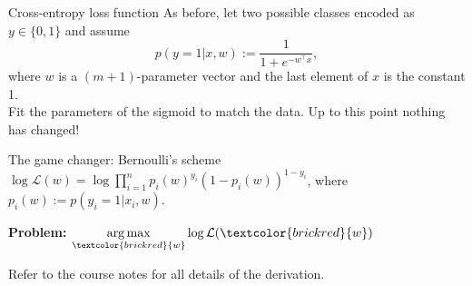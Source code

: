\documentclass[UKenglish,aspectratio=169]{beamer}
\DeclareMathOperator*{\argmax}{arg\,max}
\newcommand\unknown[1]{\textcolor{brickred}{#1}}
\begin{document}


\begin{frame}{Cross-entropy loss function}
As before, let two possible classes encoded as $y \in \{0,1\}$ and assume
$$
p(y=1|x,w) := \frac{1}{1+e^{-w^\top x}},
$$
where $w$ is a $(m+1)$-parameter vector and the last element of $x$ is the constant 1.\\

\pause
Fit the parameters of the sigmoid to match the data.
Up to this point nothing has changed!
\pause

\vspace{1ex}
\begin{block}{The game changer: Bernoulli's scheme}
$\log \mathcal{L}(w) = \log \prod_{i=1}^n p_i(w)^{y_i}  (1-p_i(w))^{1-y_i}$,
\quad where $p_i(w):=p(y_i=1|x_i, w)$.

\vspace{1ex}

\textbf{Problem:} $\argmax\limits_{\unknown{w}} \log\mathcal{L}(\unknown{w})$
\end{block}
Refer to the course notes for all details of the derivation.
\end{frame}
\end{document}
